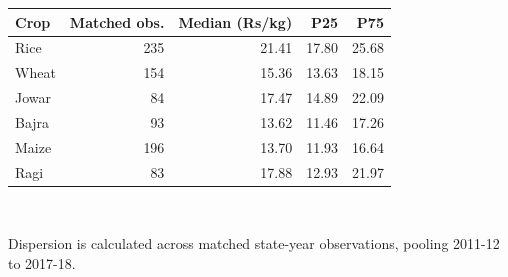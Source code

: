 \begin{small}
\begin{tabular}{lrrrr}
\toprule
Crop & Matched obs. & Median (Rs/kg) & P25 & P75 \\
\midrule
Rice & 235 & 21.41 & 17.80 & 25.68 \\
Wheat & 154 & 15.36 & 13.63 & 18.15 \\
Jowar & 84 & 17.47 & 14.89 & 22.09 \\
Bajra & 93 & 13.62 & 11.46 & 17.26 \\
Maize & 196 & 13.70 & 11.93 & 16.64 \\
Ragi & 83 & 17.88 & 12.93 & 21.97 \\
\bottomrule
\end{tabular}
\\[0.3em]
\parbox{0.95\linewidth}{\footnotesize Dispersion is calculated across matched state-year observations, pooling 2011-12 to 2017-18.}
\end{small}
